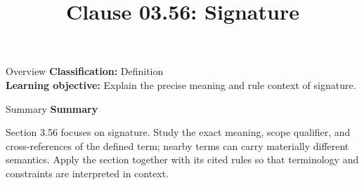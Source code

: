 \documentclass[10pt,letterpaper]{article}
\title{Clause 03.56: Signature}
\author{}
\date{}
\begin{document}
\maketitle
\begin{CornellOverviewBox}{Overview}
\textbf{Classification:} Definition\\[2pt]
\textbf{Learning objective:} Explain the precise meaning and rule context of signature.
\end{CornellOverviewBox}\begin{CornellSummaryBox}{Summary}
{\sffamily\bfseries\color{Accent} Summary}\par\vspace{3pt}Section 3.56 focuses on signature. Study the exact meaning, scope qualifier, and cross-references of the defined term; nearby terms can carry materially different semantics. Apply the section together with its cited rules so that terminology and constraints are interpreted in context.
\end{CornellSummaryBox}
\end{document}
